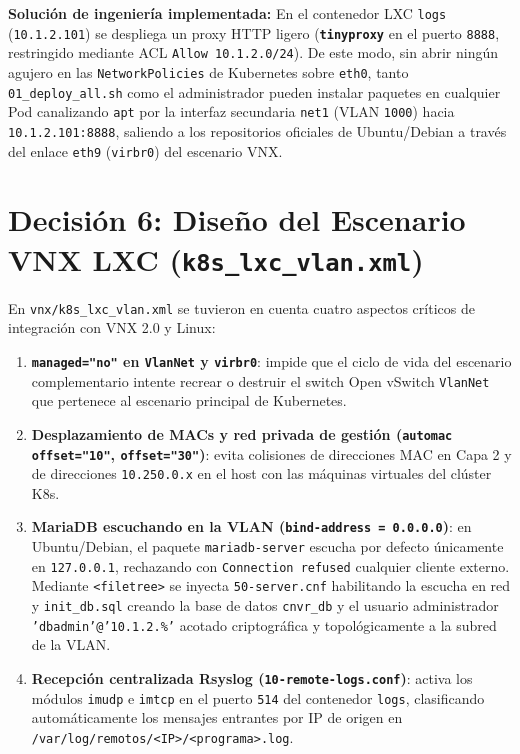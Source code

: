 \textbf{Solución de ingeniería implementada:}
En el contenedor LXC \texttt{logs} (\texttt{10.1.2.101}) se despliega un proxy HTTP ligero (\textbf{\texttt{tinyproxy}} en el puerto \texttt{8888}, restringido mediante ACL \texttt{Allow 10.1.2.0/24}). De este modo, sin abrir ningún agujero en las \texttt{NetworkPolicies} de Kubernetes sobre \texttt{eth0}, tanto \texttt{01\_deploy\_all.sh} como el administrador pueden instalar paquetes en cualquier Pod canalizando \texttt{apt} por la interfaz secundaria \texttt{net1} (VLAN \texttt{1000}) hacia \texttt{10.1.2.101:8888}, saliendo a los repositorios oficiales de Ubuntu/Debian a través del enlace \texttt{eth9} (\texttt{virbr0}) del escenario VNX.

\section{Decisión 6: Diseño del Escenario VNX LXC (\texttt{k8s\_lxc\_vlan.xml})}

En \texttt{vnx/k8s\_lxc\_vlan.xml} se tuvieron en cuenta cuatro aspectos críticos de integración con VNX 2.0 y Linux:
\begin{enumerate}
  \item \textbf{\texttt{managed="no"} en \texttt{VlanNet} y \texttt{virbr0}}: impide que el ciclo de vida del escenario complementario intente recrear o destruir el switch Open vSwitch \texttt{VlanNet} que pertenece al escenario principal de Kubernetes.
  \item \textbf{Desplazamiento de MACs y red privada de gestión (\texttt{automac offset="10"}, \texttt{offset="30"})}: evita colisiones de direcciones MAC en Capa 2 y de direcciones \texttt{10.250.0.x} en el host con las máquinas virtuales del clúster K8s.
  \item \textbf{MariaDB escuchando en la VLAN (\texttt{bind-address = 0.0.0.0})}: en Ubuntu/Debian, el paquete \texttt{mariadb-server} escucha por defecto únicamente en \texttt{127.0.0.1}, rechazando con \texttt{Connection refused} cualquier cliente externo. Mediante \texttt{<filetree>} se inyecta \texttt{50-server.cnf} habilitando la escucha en red y \texttt{init\_db.sql} creando la base de datos \texttt{cnvr\_db} y el usuario administrador \texttt{'dbadmin'@'10.1.2.\%'} acotado criptográfica y topológicamente a la subred de la VLAN.
  \item \textbf{Recepción centralizada Rsyslog (\texttt{10-remote-logs.conf})}: activa los módulos \texttt{imudp} e \texttt{imtcp} en el puerto \texttt{514} del contenedor \texttt{logs}, clasificando automáticamente los mensajes entrantes por IP de origen en \texttt{/var/log/remotos/<IP>/<programa>.log}.
\end{enumerate}
